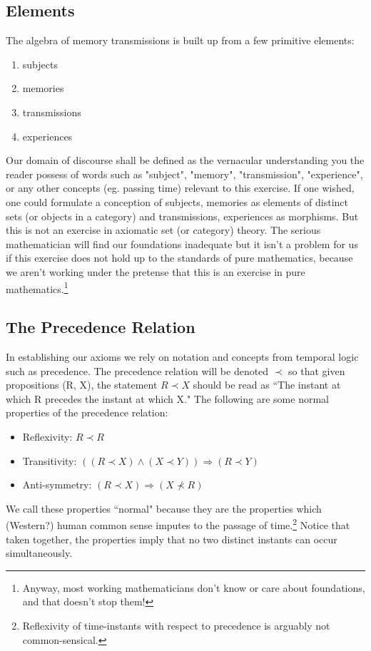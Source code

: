 \documentclass{article}
\begin{document}
\subsection*{Elements}
The algebra of memory transmissions is built up from a few primitive elements: 
\begin{enumerate}
    \item subjects
    \item memories
    \item transmissions
    \item experiences
\end{enumerate}Our domain of discourse shall be defined as the vernacular understanding you the reader possess of words such as "subject", "memory", "transmission", "experience", or any other concepts (eg. passing time) relevant to this exercise. If one wished, one could formulate a conception of subjects, memories as elements of distinct sets (or objects in a category) and transmissions, experiences as morphisms. But this is not an exercise in axiomatic set (or category) theory. The serious mathematician will find our foundations inadequate but it isn't a problem for us if this exercise does not hold up to the standards of pure mathematics, because we aren't working under the pretense that this is an exercise in pure mathematics.\footnote{Anyway, most working mathematicians don't know or care about foundations, and that doesn't stop them!}

\subsection*{The Precedence Relation}
In establishing our axioms we rely on notation and concepts from temporal logic such as precedence. The precedence relation will be denoted $\prec$ so that given propositions (R, X), the statement $R \prec X$ should be read as ``The instant at which R precedes the instant at which X." The following are some normal properties of the precedence relation:

\begin{itemize}
    \item Reflexivity: $R \prec R$
    \item Transitivity: $((R \prec X) \land (X \prec Y)) \Rightarrow (R \prec Y)$
    \item Anti-symmetry: $(R \prec X) \Rightarrow (X \nprec R)$
\end{itemize}

We call these properties ``normal" because they are the properties which (Western?) human common sense imputes to the passage of time.\footnote{Reflexivity of time-instants with respect to precedence is arguably not common-sensical.} Notice that taken together, the properties imply that no two distinct instants can occur simultaneously.
\end{document}
